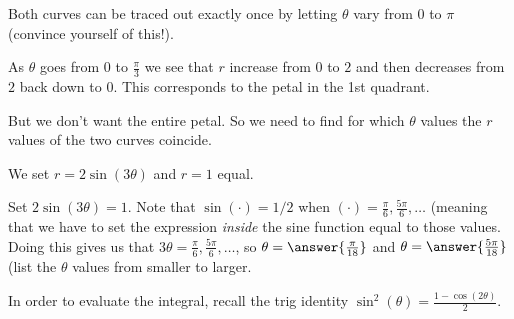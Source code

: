 \documentclass{ximera}
\begin{document}
\begin{exercise}
\begin{hint}
Both curves can be traced out exactly once by letting $\theta$ vary from $0$ to $\pi$ (convince yourself of this!).

As $\theta$ goes from $0$ to $\frac{\pi}{3}$ we see that $r$ increase from $0$ to $2$ and then decreases from $2$ back down to $0$. This corresponds to the petal in the 1st quadrant. 

But we don't want the entire petal. So we need to find for which $\theta$ values the $r$ values of the two curves coincide. 

We set $r=2\sin(3\theta)$ and $r=1$ equal. 

Set $2\sin(3\theta)=1$.  Note that $\sin(\cdot) = 1/2$ when $(\cdot) = \frac{\pi}{6},\frac{5\pi}{6}, \ldots$  (meaning that we have to set the expression \emph{inside} the sine function equal to those values.  Doing this gives us that $3 \theta = \frac{\pi}{6},\frac{5\pi}{6}, \ldots$, so $\theta=\answer{\frac{\pi}{18}}$ and $\theta=\answer{\frac{5\pi}{18}}$ (list the $\theta$ values from smaller to larger. 


In order to evaluate the integral, recall the trig identity $\sin^2(\theta)=\frac{1-\cos(2\theta)}{2}$. 










\end{hint}

\end{exercise}
\end{document}

